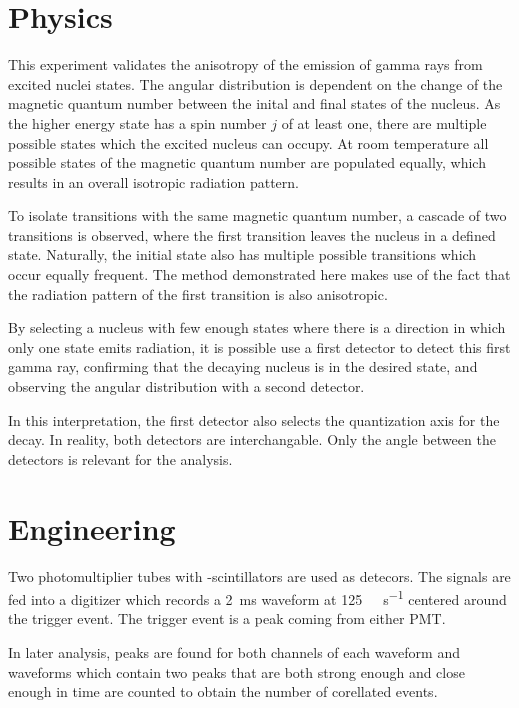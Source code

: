 \section{Physics}
This experiment validates  the anisotropy of the emission of gamma rays from excited nuclei states.
The angular distribution is dependent on the change of the magnetic quantum number between the inital and final states of the nucleus.
As the higher energy state has a spin number $j$ of at least one, there are multiple possible states which the excited nucleus can occupy.
At room temperature all possible states of the magnetic quantum number are populated equally, which results in an overall isotropic radiation pattern.

To isolate transitions with the same magnetic quantum number, a cascade of two transitions is observed, where the first transition leaves the nucleus in a defined state.
Naturally, the initial state also has multiple possible transitions which occur equally frequent.
The method demonstrated here makes use of the fact that the radiation pattern of the first transition is also anisotropic.

By selecting a nucleus with few enough states where there is a direction in which only one state emits radiation, it is possible use a first detector to detect this first gamma ray, confirming that the decaying nucleus is in the desired state, and observing the angular distribution with a second detector.

In this interpretation, the first detector also selects the quantization axis for the decay.
In reality, both detectors are interchangable.
Only the angle between the detectors is relevant for the analysis.

\section{Engineering}
Two photomultiplier tubes with -scintillators are used as  detecors.
The signals are fed into a digitizer which records a \SI{2}{\ms} waveform at \SI{125}{\kilo\samples\per\second} centered around the trigger event.
The trigger event is a peak coming from either PMT.

In later analysis, peaks are found for both channels of each waveform and waveforms which contain two peaks that are both strong enough and close enough in time are counted to obtain the number of corellated events.
